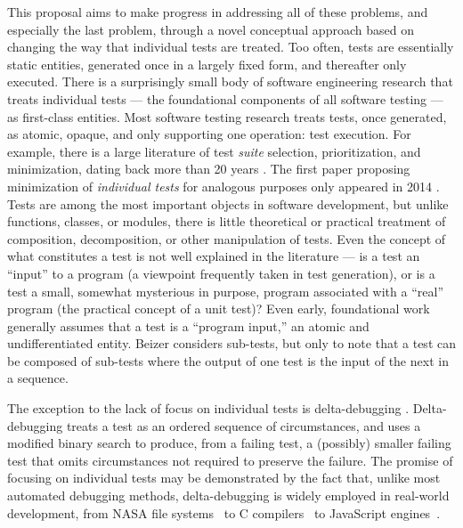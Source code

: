 This proposal aims to make progress in addressing all of these
problems, and especially the last problem, through a novel conceptual
approach based on changing the way that individual tests are
treated. Too often, tests are essentially static entities, generated
once in a largely fixed form, and thereafter only executed.  There is
a surprisingly small body of software engineering research that treats
individual tests --- the foundational components of all software
testing --- as first-class entities.  Most software testing research
treats tests, once generated, as atomic, opaque, and only supporting
one operation: test execution.  For example, there is a large
literature of test \emph{suite} selection, prioritization, and
minimization, dating back more than 20 years \cite{YooHarman}.  The
first paper proposing minimization of \emph{individual tests} for
analogous purposes only appeared in 2014 \cite{icst14}.  Tests are among the most
important objects in software development, but unlike functions,
classes, or modules, there is little theoretical or practical
treatment of composition, decomposition, or other manipulation of
tests.  Even the concept of what constitutes a test is not well
explained in the literature --- is a test an ``input'' to a program (a
viewpoint frequently taken in test generation), or is a test a small,
somewhat mysterious in purpose, program associated with a ``real''
program (the practical concept of a unit test)?  Even early,
foundational work
\cite{DBLP:journals/iandc/DavisW83,DBLP:journals/tse/WeyukerO80}
generally assumes that a test is a ``program input,'' an atomic and
undifferentiated entity.  Beizer \cite{Beizer} considers sub-tests,
but only to note that a test can be composed of sub-tests where the
output of one test is the input of the next in a sequence.

The exception to the lack of focus on individual tests is
delta-debugging \cite{DD}.  Delta-debugging treats a test as an
ordered sequence of circumstances, and uses a modified binary search
to produce, from a failing test, a (possibly) smaller failing test
that omits circumstances not required to preserve the failure.  The
promise of focusing on individual tests may be demonstrated by the
fact that, unlike most automated debugging methods, delta-debugging is
widely employed in real-world development, from NASA file
systems~\cite{ICSEDiff} to C compilers~\cite{CReduce} to JavaScript
engines~\cite{jsfunfuzz2,Lithium}.

